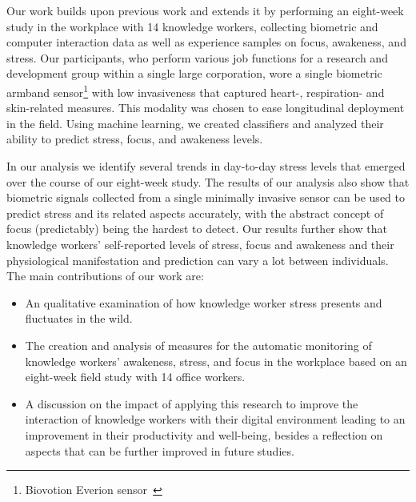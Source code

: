 Our work builds upon previous work and extends it by performing an eight-week 
study in the workplace with 14 knowledge workers, collecting biometric and 
computer interaction data as well as experience samples on focus, awakeness, 
and stress. Our participants, who perform various job functions for a research 
and development group within a single large corporation, wore a single 
biometric armband sensor\footnote{Biovotion Everion sensor~\cite{everion}} 
with low invasiveness that captured heart-, respiration- and skin-related measures. This 
modality was chosen to ease longitudinal deployment in the field. Using 
machine learning, we created classifiers and analyzed their ability to predict stress, focus, and awakeness levels.

In our analysis we identify several trends in day-to-day stress levels that emerged over the course of our eight-week study.
The results of our analysis also show that biometric signals collected from a single minimally invasive sensor can be used to predict stress and its related aspects accurately, with the abstract concept of focus (predictably) being the hardest to detect. Our results further show that knowledge workers' self-reported levels of stress, focus and awakeness and their physiological manifestation and prediction can vary a lot between individuals. 
The main contributions of our work are:
\begin{itemize}
	\item An qualitative examination of how knowledge worker stress presents and fluctuates in the wild.
	\item The creation and analysis of measures for the automatic monitoring of knowledge workers' awakeness, stress, and focus in the workplace based on an eight-week field study with 14 office workers.
	\item A discussion on the impact of applying this research to improve
the interaction of knowledge workers with their digital environment leading to an improvement in their productivity and well-being, besides a reflection on aspects that can be further improved in future studies.
    \end{itemize}

